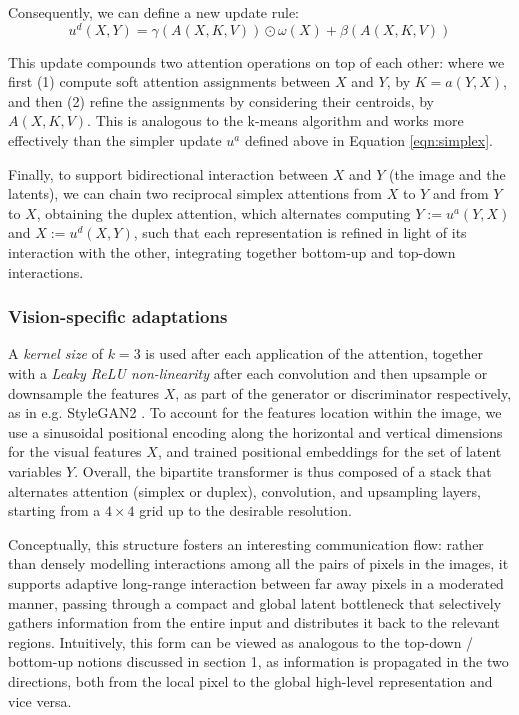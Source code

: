 \documentclass{article}
\begin{document}
	Consequently, we can define a new update rule:
	\begin{equation}
		\label{eqn:duplex}
		u^d(X, Y )=\gamma (A(X, K, V)) \odot \omega (X) + \beta (A(X, K, V))
	\end{equation}

	This update compounds two attention operations on top of each other: where we first (1) compute 
	soft attention assignments between $X$ and $Y$, by $K = a(Y, X)$, and then (2) refine the 
	assignments by considering their centroids, by $A(X, K, V)$. This is analogous to the k-means 
	algorithm and works more effectively than the simpler update $u^a$ defined above in Equation 
	\eqref{eqn:simplex}.
	
	Finally, to support bidirectional interaction between $X$ and $Y$ (the image and the latents), we can 
	chain two reciprocal simplex attentions from $X$ to $Y$ and from $Y$ to $X$, obtaining the duplex 
	attention, which alternates computing $Y :=u^a(Y,X)$ and $X:=u^d(X,Y)$, such that each 
	representation is refined in light of its interaction with the other, integrating together bottom-up and 
	top-down interactions.
	
	\subsubsection{Vision-specific adaptations}%
	A \textit{kernel size} of $k = 3$ is used after each application of the attention, together with a 
	\textit{Leaky ReLU non-linearity} after each convolution and then upsample or downsample the 
	features $X$, as part of the generator or discriminator respectively, as in e.g. StyleGAN2 
	\cite{karras2020analyzing}. 
	To account for the features location within the image, we use a sinusoidal positional encoding along 
	the horizontal and vertical dimensions for the visual features $X$, and trained positional 
	embeddings for the set of latent variables $Y$.
	Overall, the bipartite transformer is thus composed of a stack that alternates attention (simplex or 
	duplex), convolution, and upsampling layers, starting from a $4 \times 4$ grid up to the desirable 
	resolution. 
	
	Conceptually, this structure fosters an interesting communication flow: rather than densely 
	modelling interactions among all the pairs of pixels in the images, it supports adaptive long-range 
	interaction between far away pixels in a moderated manner, passing through a compact and global 
	latent bottleneck that selectively gathers information from the entire input and distributes it back to 
	the relevant regions. Intuitively, this form can be viewed as analogous to the top-down / bottom-up 
	notions discussed in section 1, as information is propagated in the two directions, both from the 
	local pixel to the global high-level representation and vice versa.
	
\end{document}
